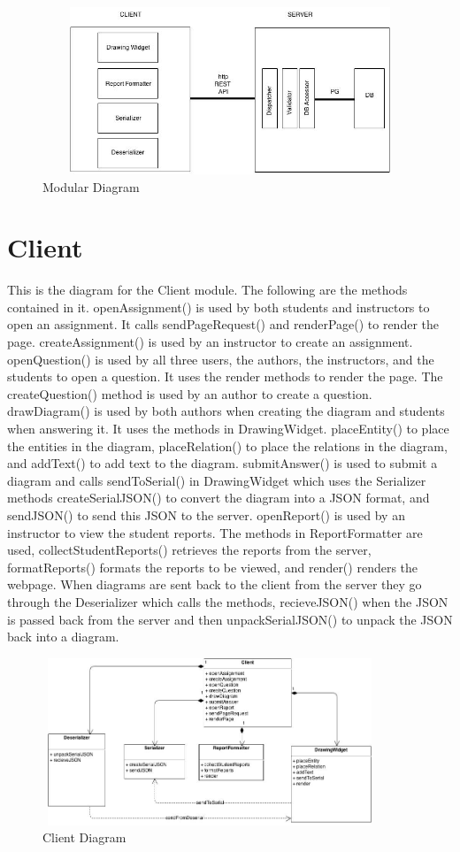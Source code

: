                         \begin{figure}[H]
            \centerline{\includegraphics[height=5cm, width=12cm]{Modular.jpg}}
            \caption{Modular Diagram}
    \end{figure}
    
    \chapter{Client}
This is the diagram for the Client module. The following are the methods contained in it. openAssignment() is used by both students and instructors to open an assignment. It calls sendPageRequest() and renderPage() to render the page. createAssignment() is used by an instructor to create an assignment. openQuestion() is used by all three users, the authors, the instructors, and the students to open a question. It uses the render methods to render the page. The createQuestion() method is used by an author to create a question. drawDiagram() is used by both authors when creating the diagram and students when answering it. It uses the methods in DrawingWidget. placeEntity() to place the entities in the diagram, placeRelation() to place the relations in the diagram, and addText() to add text to the diagram. submitAnswer() is used to submit a diagram and calls sendToSerial() in DrawingWidget which uses the Serializer methods createSerialJSON() to convert the diagram into a JSON format, and sendJSON() to send this JSON to the server. openReport() is used by an instructor to view the student reports. The methods in ReportFormatter are used, collectStudentReports() retrieves the reports from the server, formatReports() formats the reports to be viewed, and render() renders the webpage.  When diagrams are sent back to the client from the server they go through the Deserializer which calls the methods, recieveJSON() when the JSON is passed back from the server and then unpackSerialJSON() to unpack the JSON back into a diagram.
  
                        \begin{figure}[H]
            \centerline{\includegraphics[height=5cm, width=10cm]{Client.jpg}}
            \caption{Client Diagram}
    \end{figure}
    

